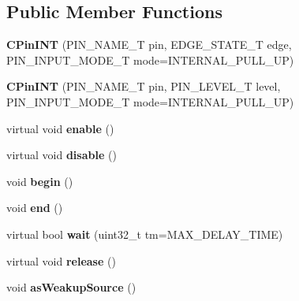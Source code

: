 \subsection*{Public Member Functions}
\begin{DoxyCompactItemize}
\item 
\hypertarget{class_c_pin_i_n_t_a71f5452b1d99597b04082bf402f4ae59}{{\bfseries C\-Pin\-I\-N\-T} (P\-I\-N\-\_\-\-N\-A\-M\-E\-\_\-\-T pin, E\-D\-G\-E\-\_\-\-S\-T\-A\-T\-E\-\_\-\-T edge, P\-I\-N\-\_\-\-I\-N\-P\-U\-T\-\_\-\-M\-O\-D\-E\-\_\-\-T mode=I\-N\-T\-E\-R\-N\-A\-L\-\_\-\-P\-U\-L\-L\-\_\-\-U\-P)}\label{class_c_pin_i_n_t_a71f5452b1d99597b04082bf402f4ae59}

\item 
\hypertarget{class_c_pin_i_n_t_a48e6afdca1e70de51e292d1d3c4bafc5}{{\bfseries C\-Pin\-I\-N\-T} (P\-I\-N\-\_\-\-N\-A\-M\-E\-\_\-\-T pin, P\-I\-N\-\_\-\-L\-E\-V\-E\-L\-\_\-\-T level, P\-I\-N\-\_\-\-I\-N\-P\-U\-T\-\_\-\-M\-O\-D\-E\-\_\-\-T mode=I\-N\-T\-E\-R\-N\-A\-L\-\_\-\-P\-U\-L\-L\-\_\-\-U\-P)}\label{class_c_pin_i_n_t_a48e6afdca1e70de51e292d1d3c4bafc5}

\item 
\hypertarget{class_c_pin_i_n_t_a36d2301b10290741be6d3dd86dbc534b}{virtual void {\bfseries enable} ()}\label{class_c_pin_i_n_t_a36d2301b10290741be6d3dd86dbc534b}

\item 
\hypertarget{class_c_pin_i_n_t_a08521d6d6892b7a80452bfce7db03e2b}{virtual void {\bfseries disable} ()}\label{class_c_pin_i_n_t_a08521d6d6892b7a80452bfce7db03e2b}

\item 
\hypertarget{class_c_pin_i_n_t_a811526191ebf7ba17f0f51dea004d37b}{void {\bfseries begin} ()}\label{class_c_pin_i_n_t_a811526191ebf7ba17f0f51dea004d37b}

\item 
\hypertarget{class_c_pin_i_n_t_a9f65ac4a7485b63e46b232f8d7ab385f}{void {\bfseries end} ()}\label{class_c_pin_i_n_t_a9f65ac4a7485b63e46b232f8d7ab385f}

\item 
\hypertarget{class_c_pin_i_n_t_a45e9fb4b6e6300e4c1c2ed6c13cfc062}{virtual bool {\bfseries wait} (uint32\-\_\-t tm=M\-A\-X\-\_\-\-D\-E\-L\-A\-Y\-\_\-\-T\-I\-M\-E)}\label{class_c_pin_i_n_t_a45e9fb4b6e6300e4c1c2ed6c13cfc062}

\item 
\hypertarget{class_c_pin_i_n_t_abe0ce7ac090423e11d460e75c8838128}{virtual void {\bfseries release} ()}\label{class_c_pin_i_n_t_abe0ce7ac090423e11d460e75c8838128}

\item 
\hypertarget{class_c_pin_i_n_t_ae30634b8f9107d2ce4b6c3a52aeb380a}{void {\bfseries as\-Weakup\-Source} ()}\label{class_c_pin_i_n_t_ae30634b8f9107d2ce4b6c3a52aeb380a}

\end{DoxyCompactItemize}
